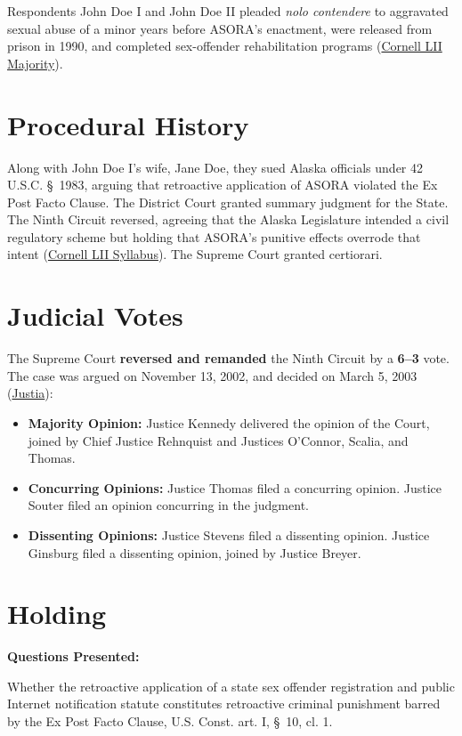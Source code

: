 \documentclass[12pt]{article}
\begin{document}
Respondents John Doe I and John Doe II pleaded \textit{nolo contendere} to aggravated sexual abuse of a minor years before ASORA's enactment, were released from prison in 1990, and completed sex-offender rehabilitation programs (\href{https://www.law.cornell.edu/supct/html/01-729.ZO.html}{Cornell LII Majority}).

\section{Procedural History}
Along with John Doe I's wife, Jane Doe, they sued Alaska officials under 42 U.S.C. \S\ 1983, arguing that retroactive application of ASORA violated the Ex Post Facto Clause. The District Court granted summary judgment for the State. The Ninth Circuit reversed, agreeing that the Alaska Legislature intended a civil regulatory scheme but holding that ASORA's punitive effects overrode that intent (\href{https://www.law.cornell.edu/supct/html/01-729.ZS.html}{Cornell LII Syllabus}). The Supreme Court granted certiorari.

\section{Judicial Votes}
The Supreme Court \textbf{reversed and remanded} the Ninth Circuit by a \textbf{6--3} vote. The case was argued on November 13, 2002, and decided on March 5, 2003 (\href{https://supreme.justia.com/cases/federal/us/538/84/}{Justia}):

\begin{itemize}
    \item \textbf{Majority Opinion:} Justice Kennedy delivered the opinion of the Court, joined by Chief Justice Rehnquist and Justices O'Connor, Scalia, and Thomas.
    \item \textbf{Concurring Opinions:} Justice Thomas filed a concurring opinion. Justice Souter filed an opinion concurring in the judgment.
    \item \textbf{Dissenting Opinions:} Justice Stevens filed a dissenting opinion. Justice Ginsburg filed a dissenting opinion, joined by Justice Breyer.
\end{itemize}

\section{Holding}
\textbf{Questions Presented:}

Whether the retroactive application of a state sex offender registration and public Internet notification statute constitutes retroactive criminal punishment barred by the Ex Post Facto Clause, U.S. Const. art. I, \S\ 10, cl. 1.
\end{document}
